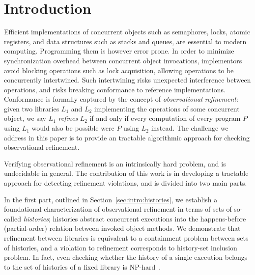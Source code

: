 \section{Introduction}

Efficient implementations of concurrent objects such as semaphores, locks,
atomic registers, and data structures such as stacks and queues, are essential
to modern computing. Programming them is however error prone. In order to
minimize synchronization overhead between concurrent object invocations,
implementors avoid blocking operations such as lock acquisition, allowing
operations to be concurrently intertwined. Such intertwining risks unexpected
interference between operations, and risks breaking conformance to reference
implementations. Conformance is formally captured by the concept of
\emph{observational refinement}: given two libraries $L_1$ and $L_2$
implementing the operations of some concurrent object, we say $L_1$
\emph{refines} $L_2$ if and only if every computation of every program $P$
using $L_1$ would also be possible were $P$ using $L_2$ instead. The challenge
we address in this paper is to provide an tractable algorithmic approach for
checking observational refinement.

Verifying observational refinement is an intrinsically hard problem, and is
undecidable in general. The contribution of this work is in developing a
tractable approach for detecting refinement violations, and is divided into two
main parts.

In the first part, outlined in Section~\ref{sec:intro:histories}, we establish
a foundational characterization of observational refinement in terms of sets of
so-called \emph{histories}; histories abstract concurrent executions into the
happens-before (partial-order) relation between invoked object methods. We
demonstrate that refinement between libraries is equivalent to a containment
problem between sets of histories, and a violation to refinement corresponds to
history-set inclusion problem. In fact, even checking whether the history of a
single execution belongs to the set of histories of a fixed library is
NP-hard~\cite{journals/siamcomp/GibbonsK97}.


